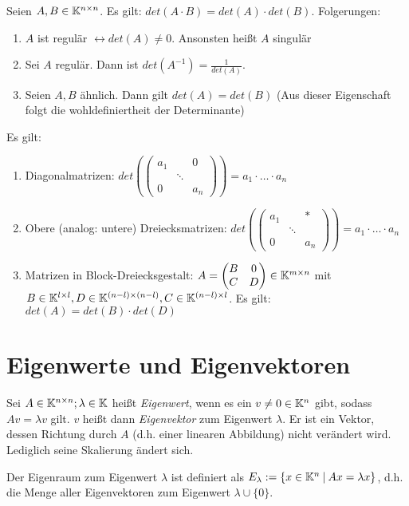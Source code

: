 \begin{satz}[Determinantenmultiplikationssatz]
	Seien $A,B \in \mathbb{K}^{n \times n}$. Es gilt: $det(A \cdot B) = det(A) \cdot det(B)$. Folgerungen:
	
	\begin{enumerate}[noitemsep]
		\item $A$ ist regulär $\leftrightarrow det(A) \neq 0$. Ansonsten heißt $A$ singulär
		\item Sei $A$ regulär. Dann ist $det(A^{-1}) = \frac{1}{det(A)}$.
		\item Seien $A,B$ ähnlich. Dann gilt $det(A) = det(B)$ (Aus dieser Eigenschaft folgt die wohldefiniertheit der Determinante)
	\end{enumerate}
\end{satz}

\begin{satz} Es gilt:
	\begin{enumerate}[noitemsep]
		\item Diagonalmatrizen: $det( \left( \begin{smallmatrix}
		a_1 & & 0 \\
		& \ddots & \\
		0 & & a_n 
		\end{smallmatrix} \right) ) = a_1 \cdot \dots \cdot a_n$
		\item Obere (analog: untere) Dreiecksmatrizen: $det( \left( \begin{smallmatrix}
		a_1 & & * \\
		& \ddots & \\
		0 & & a_n 
		\end{smallmatrix}  \right) ) = a_1 \cdot \dots \cdot a_n$
		\item Matrizen in Block-Dreiecksgestalt: $A = \begin{pmatrix}
		B & 0 \\
		C & D 
		\end{pmatrix} \in \mathbb{K}^{m \times n}$ mit $B \in \mathbb{K}^{l \times l}, D \in \mathbb{K}^{(n-l) \times (n-l)}, C \in \mathbb{K}^{(n-l) \times l}$.
		Es gilt: $det(A) = det(B) \cdot det(D)$
	\end{enumerate}
\end{satz}


\section{Eigenwerte und Eigenvektoren}
\begin{definition}	
	Sei $A \in \mathbb{K}^{n \times n}; \lambda \in \mathbb{K} $ heißt \emph{Eigenwert}, wenn es ein $v \neq 0 \in \mathbb{K}^n$ gibt, sodass $Av = \lambda v$ gilt. $v$ heißt dann \emph{Eigenvektor} zum Eigenwert $\lambda$. Er ist ein Vektor, dessen Richtung durch $A$ (d.h. einer linearen Abbildung) nicht verändert wird. Lediglich seine Skalierung ändert sich.

	Der Eigenraum zum Eigenwert $\lambda$ ist definiert als $E_\lambda := \{x \in \mathbb{K}^n \medspace | \medspace Ax = \lambda x \}$, d.h. die Menge aller Eigenvektoren zum Eigenwert $\lambda \cup \{0\}$. 
\end{definition}

